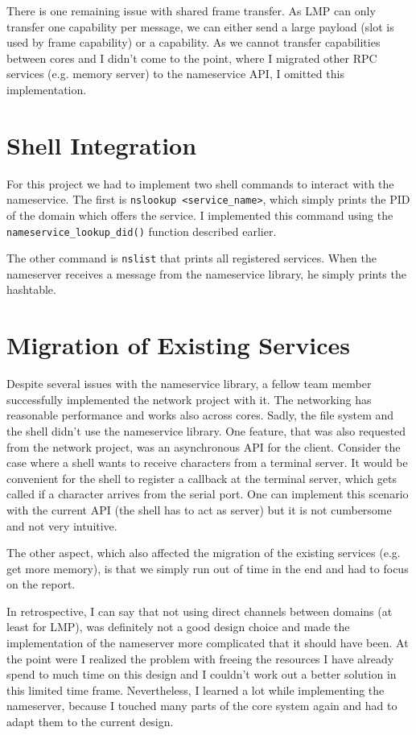 There is one remaining issue with shared frame transfer. As LMP can only transfer one capability per message, we can either send a large
payload (slot is used by frame capability) or a capability. As we cannot transfer capabilities between cores and I didn't come to the point,
where I migrated other RPC services (e.g. memory server) to the nameservice API, I omitted this implementation.

\section{Shell Integration}

For this project we had to implement two shell commands to interact with the nameservice. The first is \verb|nslookup <service_name>|, which
simply prints the PID of the domain which offers the service. I implemented this command using the \verb|nameservice_lookup_did()| function
described earlier.

The other command is \verb|nslist| that prints all registered services. When the nameserver receives a message from the nameservice library,
he simply prints the hashtable.

\section{Migration of Existing Services}

Despite several issues with the nameservice library, a fellow team member successfully implemented the network project with it. The
networking has reasonable performance and works also across cores. Sadly, the file system and the shell didn't use the nameservice
library. One feature, that was also requested from the network project, was an asynchronous API for the client. Consider the case
where a shell wants to receive characters from a terminal server. It would be convenient for the shell to register a callback at
the terminal server, which gets called if a character arrives from the serial port. One can implement this scenario with the current
API (the shell has to act as server) but it is not cumbersome and not very intuitive.

The other aspect, which also affected the migration of the existing services (e.g. get more memory), is that we simply run out of
time in the end and had to focus on the report.

In retrospective, I can say that not using direct channels between domains (at least for LMP), was definitely not a good design choice and
made the implementation of the nameserver more complicated that it should have been. At the point were I realized the problem with freeing
the resources I have already spend to much time on this design and I couldn't work out a better solution in this limited time frame. 
Nevertheless, I learned a lot while implementing the nameserver, because I touched many parts of the core system again and had to adapt them
to the current design.
